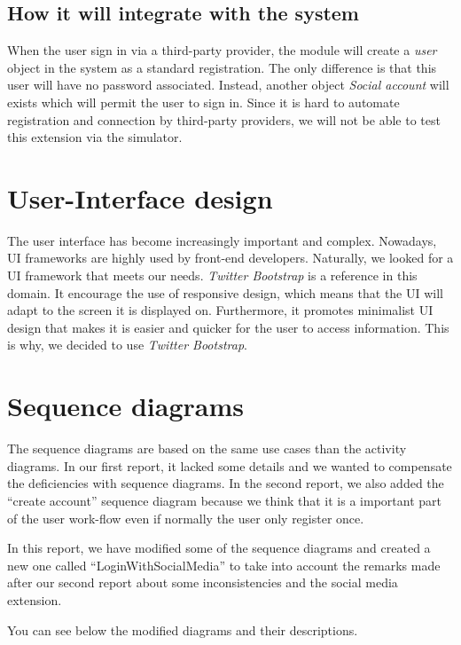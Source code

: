 \documentclass[11pt, a4paper]{article}   	%
\begin{document}
\subsection*{How it will integrate with the system}
When the user sign in via a third-party provider, the module will create a \textit{user} object in the system as a standard registration.
The only difference is that this user will have no password associated.
Instead, another object \textit{Social account} will exists which will permit the user to sign in.
Since it is hard to automate registration and connection by third-party providers, we will not be able to test this extension via the simulator.


\section{User-Interface design}
The user interface has become increasingly important and complex.
Nowadays, UI frameworks are highly used by front-end developers.
Naturally, we looked for a UI framework that meets our needs.
\textit{Twitter Bootstrap} is a reference in this domain.
It encourage the use of responsive design, which means that the UI will adapt to the screen it is displayed on.
Furthermore, it promotes minimalist UI design that makes it is easier and quicker for the user to access information. This is why, we decided to use \textit{Twitter Bootstrap}.


\section{Sequence diagrams}

The sequence diagrams are based on the same use cases than the activity diagrams. In our first report, it lacked some details and we wanted
to compensate the deficiencies with sequence diagrams. In the second report, we also added the \enquote{create account} sequence diagram because we think that it is a important part of the user work-flow even if normally the user only register once.

In this report, we have modified some of the sequence diagrams and created a new one called \enquote{LoginWithSocialMedia} to take into account the remarks made after our second report about some inconsistencies and the social media extension.

You can see below the modified diagrams and their descriptions.
\end{document}

